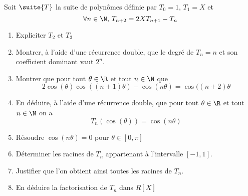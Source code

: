 \documentclass[a4paper, 11pt,reqno]{article}
\begin{document}
\vspace{2cm}
\begin{exercice}
Soit $\suite{T}$ la suite de polynômes définie par 
$T_0 =1, \, T_1=X$ et 
$$\forall n\in \N, \, T_{n+2}=2XT_{n+1} -T_n$$
\begin{enumerate}
\item Expliciter $T_2$ et $T_3$

\item Montrer, à l'aide d'une récurrence double, que le degré de $T_n=n$ et  son coefficient dominant  vaut $2^n$. 
\item Montrer que pour tout $\theta\in \R$ et tout $n\in \N$ que 
$$2\cos(\theta)\cos((n+1)\theta) -\cos(n\theta) = \cos((n+2)\theta$$
\item En déduire, à l'aide d'une récurrence double, que pour tout $\theta \in \R$ et tout $n\in \N$ on a 
$$T_n(\cos(\theta))=\cos(n\theta)$$
\item Résoudre $\cos(n\theta) =0$ pour $\theta \in [0,\pi]$
\item Déterminer les racines de $T_n$ appartenant à  l'intervalle $[-1,1]$.
\item Justifier que l'on obtient ainsi toutes les racines de $T_n$. 
\item En déduire la factorisation de $T_n$ dans $R[X]$
\end{enumerate}
\end{exercice}
\end{document}
